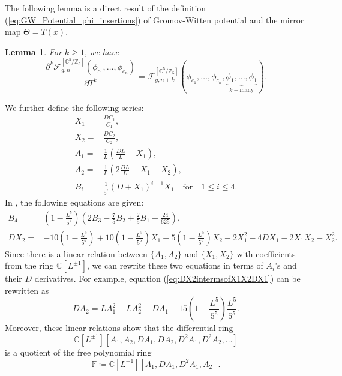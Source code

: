 \documentclass[12pt]{amsart}
\newtheorem{lem}[prop]{Lemma}
\numberwithin{equation}{section}
\begin{document}
The following lemma is a direct result of the definition (\ref{eq:GW_Potential_phi_insertions}) of Gromov-Witten potential and the mirror map $\Theta=T(x)$.
\begin{lem}\label{lem:partialwrtmirrormap}
For $k\geq{1}$, we have
\begin{equation*}
\frac{\partial^k\mathcal{F}_{g, n}^{\left[\mathbb{C}^{5} / \mathbb{Z}_{5}\right]}\left(\phi_{c_{1}}, \ldots, \phi_{c_{n}}\right)}{\partial T^k}=\mathcal{F}_{g, n+k}^{\left[\mathbb{C}^{5} / \mathbb{Z}_{5}\right]}(\phi_{c_{1}}, \ldots, \phi_{c_{n}},\underbrace{\phi_1,\ldots,\phi_1}_{k-\text{many}}).
\end{equation*}
\end{lem}
We further define the following series:
\begin{equation}
\begin{aligned}
X_1=&\frac{DC_1}{C_1},\\
X_2=&\frac{DC_2}{C_2},\\
A_1=&\frac{1}{L}\left(\frac{DL}{L}-X_1\right),\\
A_2=&\frac{1}{L}\left(2\frac{DL}{L}-X_1-X_2\right),\\
B_i=&\frac{1}{5^i}(D+X_1)^{i-1}X_1\quad\text{for}\quad 1\leq{i}\leq{4}.
\end{aligned}
\end{equation}
In \cite[Section 3]{lho}, the following equations are given:
\begin{align}
B_4=&\left(1-\frac{L^5}{5^5}\right)\left(2 B_3-\frac{7}{5} B_2+\frac{2}{5} B_1-\frac{24}{625}\right), \\
DX_2=&-10\left(1-\frac{L^5}{5^5}\right)+10\left(1-\frac{L^5}{5^5}\right)X_1+5\left(1-\frac{L^5}{5^5}\right)X_2-2X_1^2-4DX_1-2X_1X_2-X_2^2 .\label{eq:DX2intermsofX1X2DX1}
\end{align}
Since there is a linear relation between $\{A_1,A_2\}$ and $\{X_1,X_2\}$ with coefficients from the ring $\mathbb{C}[L^{\pm 1}]$, we can rewrite these two equations in terms of $A_i$'s and their $D$ derivatives. For example, equation (\ref{eq:DX2intermsofX1X2DX1}) can be rewritten as
\begin{equation}\label{eq:DA2_intermsof_A1DA1A2}
DA_2=LA_1^2+LA_2^2-DA_1-15\left(1-\frac{L^5}{5^5}\right)\frac{L^5}{5^5}.
\end{equation}
Moreover, these linear relations show that the differential ring
\begin{equation*}
\mathbb{C}[L^{\pm 1}][A_1,A_2,DA_1,DA_2,D^2A_1,D^2A_2,\ldots]
\end{equation*}
is a quotient of the free polynomial ring
\begin{equation*}
\mathbb{F}\coloneqq\mathbb{C}[L^{\pm 1}][A_1,DA_1,D^2A_1,A_2].
\end{equation*}
\end{document}
